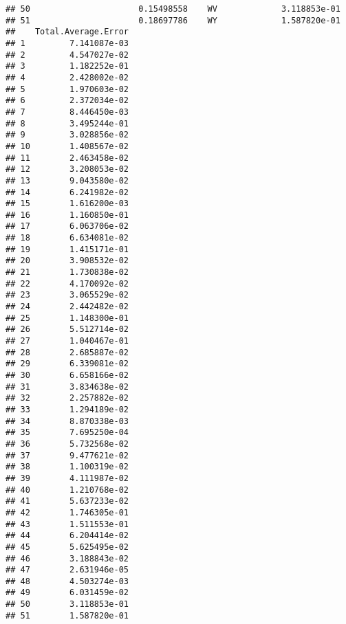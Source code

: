 \documentclass{article}\usepackage[]{graphicx}\usepackage[]{color}
\makeatletter
\newenvironment{kframe}{%
 \def\at@end@of@kframe{}%
 \ifinner\ifhmode%
  \def\at@end@of@kframe{\end{minipage}}%
  \begin{minipage}{\columnwidth}%
 \fi\fi%
 \def\FrameCommand##1{\hskip\@totalleftmargin \hskip-\fboxsep
 \colorbox{shadecolor}{##1}\hskip-\fboxsep
     \hskip-\linewidth \hskip-\@totalleftmargin \hskip\columnwidth}%
 \MakeFramed {\advance\hsize-\width
   \@totalleftmargin\z@ \linewidth\hsize
   \@setminipage}}%
 {\par\unskip\endMakeFramed%
 \at@end@of@kframe}
\newenvironment{knitrout}{}{} %
\makeatother
\begin{document}
\begin{knitrout}
\begin{kframe}
\begin{verbatim}
## 50                      0.15498558    WV             3.118853e-01
## 51                      0.18697786    WY             1.587820e-01
##    Total.Average.Error
## 1         7.141087e-03
## 2         4.547027e-02
## 3         1.182252e-01
## 4         2.428002e-02
## 5         1.970603e-02
## 6         2.372034e-02
## 7         8.446450e-03
## 8         3.495244e-01
## 9         3.028856e-02
## 10        1.408567e-02
## 11        2.463458e-02
## 12        3.208053e-02
## 13        9.043580e-02
## 14        6.241982e-02
## 15        1.616200e-03
## 16        1.160850e-01
## 17        6.063706e-02
## 18        6.634081e-02
## 19        1.415171e-01
## 20        3.908532e-02
## 21        1.730838e-02
## 22        4.170092e-02
## 23        3.065529e-02
## 24        2.442482e-02
## 25        1.148300e-01
## 26        5.512714e-02
## 27        1.040467e-01
## 28        2.685887e-02
## 29        6.339081e-02
## 30        6.658166e-02
## 31        3.834638e-02
## 32        2.257882e-02
## 33        1.294189e-02
## 34        8.870338e-03
## 35        7.695250e-04
## 36        5.732568e-02
## 37        9.477621e-02
## 38        1.100319e-02
## 39        4.111987e-02
## 40        1.210768e-02
## 41        5.637233e-02
## 42        1.746305e-01
## 43        1.511553e-01
## 44        6.204414e-02
## 45        5.625495e-02
## 46        3.188843e-02
## 47        2.631946e-05
## 48        4.503274e-03
## 49        6.031459e-02
## 50        3.118853e-01
## 51        1.587820e-01
\end{verbatim}
\end{kframe}
\end{knitrout}
\end{document}
